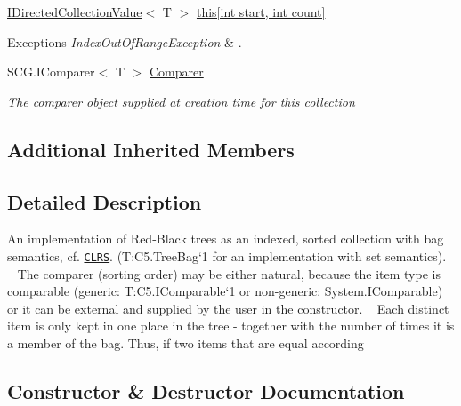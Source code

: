 \begin{DoxyCompactItemize}
\item 
\hyperlink{interface_c5_1_1_i_directed_collection_value}{I\+Directed\+Collection\+Value}$<$ T $>$ \hyperlink{class_c5_1_1_tree_bag_a34880d76610a5dd5063149053fb549d1}{this\mbox{[}int start, int count\mbox{]}}
\begin{DoxyCompactList}\small\item\em 
\begin{DoxyExceptions}{Exceptions}
{\em Index\+Out\+Of\+Range\+Exception} & . \\
\hline
\end{DoxyExceptions}
\end{DoxyCompactList}\item 
S\+C\+G.\+I\+Comparer$<$ T $>$ \hyperlink{class_c5_1_1_tree_bag_ab679605413db459d72a16048bbe1a53d}{Comparer}
\begin{DoxyCompactList}\small\item\em The comparer object supplied at creation time for this collection \end{DoxyCompactList}\end{DoxyCompactItemize}
\subsection*{Additional Inherited Members}


\subsection{Detailed Description}
An implementation of Red-\/\+Black trees as an indexed, sorted collection with bag semantics, cf. \href{litterature.htm#CLRS}{\tt C\+L\+R\+S}. (T\+:\+C5.\+Tree\+Bag`1 for an implementation with set semantics). ~\newline
 The comparer (sorting order) may be either natural, because the item type is comparable (generic\+: T\+:\+C5.\+I\+Comparable`1 or non-\/generic\+: System.\+I\+Comparable) or it can be external and supplied by the user in the constructor. ~\newline
 Each distinct item is only kept in one place in the tree -\/ together with the number of times it is a member of the bag. Thus, if two items that are equal according 



\subsection{Constructor \& Destructor Documentation}
\hypertarget{class_c5_1_1_tree_bag_a5bde6ec5c04b5bdc82306b2fd8b436fd}{}
